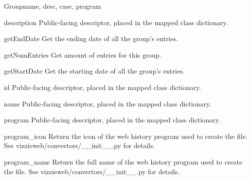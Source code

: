 \documentclass[letterpaper,10pt,english]{manual}
\begin{document}
\begin{classdesc}{Group}{name, desc, case, program}
\hypertarget{webscavator.model.models.Group.description}{}\begin{memberdesc}{description}
Public-facing descriptor, placed in the mapped class dictionary.
\end{memberdesc}

\hypertarget{webscavator.model.models.Group.getEndDate}{}\begin{methoddesc}{getEndDate}{}
Get the ending date of all the group's entries.
\end{methoddesc}

\hypertarget{webscavator.model.models.Group.getNumEntries}{}\begin{methoddesc}{getNumEntries}{}
Get amount of entries for this group.
\end{methoddesc}

\hypertarget{webscavator.model.models.Group.getStartDate}{}\begin{methoddesc}{getStartDate}{}
Get the starting date of all the group's entries.
\end{methoddesc}

\hypertarget{webscavator.model.models.Group.id}{}\begin{memberdesc}{id}
Public-facing descriptor, placed in the mapped class dictionary.
\end{memberdesc}

\hypertarget{webscavator.model.models.Group.name}{}\begin{memberdesc}{name}
Public-facing descriptor, placed in the mapped class dictionary.
\end{memberdesc}

\hypertarget{webscavator.model.models.Group.program}{}\begin{memberdesc}{program}
Public-facing descriptor, placed in the mapped class dictionary.
\end{memberdesc}

\hypertarget{webscavator.model.models.Group.program_icon}{}\begin{memberdesc}{program\_icon}
Return the icon of the web history program used to create the file. See 
vizzieweb/convertors/\_\_init\_\_.py for details.
\end{memberdesc}

\hypertarget{webscavator.model.models.Group.program_name}{}\begin{memberdesc}{program\_name}
Return the full name of the web history program used to create the file. See 
vizzieweb/convertors/\_\_init\_\_.py for details.
\end{memberdesc}
\end{classdesc}
\end{document}
